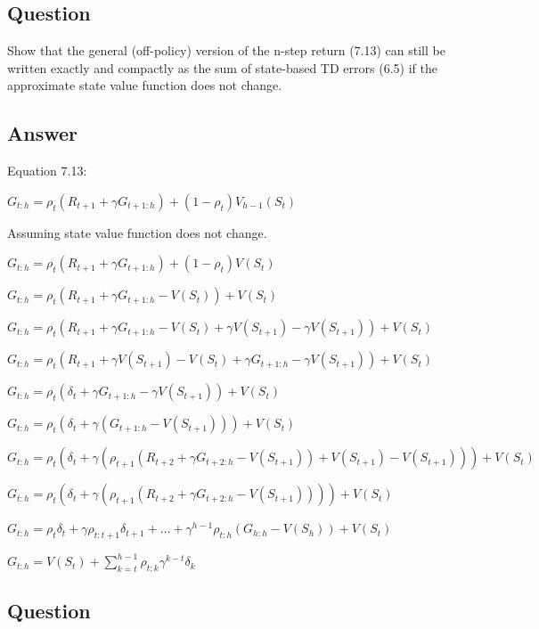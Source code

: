 \documentclass[11pt]{article}
\begin{document}
    \subsection{Question}

    Show that the general (off-policy) version of the n-step return (7.13) can still be written exactly and compactly as the sum of state-based TD errors (6.5) if the  approximate state value function does not change.

    \subsection*{Answer}

    Equation 7.13:

    $ G_{t:h} =  \rho_t (R_{t+1} + \gamma G_{t+1:h} ) + (1 - \rho_t) V_{h-1}(S_t) $

    \noindent Assuming state value function does not change.

    \noindent $ G_{t:h} = \rho_t (R_{t+1} + \gamma G_{t+1:h} ) + (1 - \rho_t) V(S_t) $

    \noindent $ G_{t:h} = \rho_t (R_{t+1} + \gamma G_{t+1:h} - V(S_t)) + V(S_t)  $

    \noindent $ G_{t:h} = \rho_t (R_{t+1} + \gamma G_{t+1:h} - V(S_t) + \gamma V(S_{t+1}) - \gamma V(S_{t+1})) + V(S_t)  $

    \noindent $ G_{t:h} = \rho_t (R_{t+1} + \gamma V(S_{t+1})- V(S_t)  + \gamma G_{t+1:h} - \gamma V(S_{t+1})) + V(S_t)  $

    \noindent $ G_{t:h} = \rho_t (\delta_t  + \gamma G_{t+1:h} - \gamma V(S_{t+1})) + V(S_t)  $

    \noindent $ G_{t:h} = \rho_t (\delta_t  + \gamma (G_{t+1:h} - V(S_{t+1}) )) + V(S_t)  $

    \noindent $ G_{t:h} = \rho_t (\delta_t  + \gamma (   \rho_{t+1} (R_{t+2} + \gamma G_{t+2:h} - V(S_{t+1})) + V(S_{t+1})  - V(S_{t+1}) )) + V(S_t)  $

    \noindent $ G_{t:h} = \rho_t (\delta_t  + \gamma (   \rho_{t+1} (R_{t+2} + \gamma G_{t+2:h} - V(S_{t+1})) )) + V(S_t)  $

    \noindent $ G_{t:h} = \rho_t \delta_t  + \gamma \rho_{t:t+1} \delta_{t+1} + \dots + \gamma^{h-1} \rho_{t:h} (G_{h:h} - V(S_h)) + V(S_t)  $

    \noindent $ G_{t:h} = V(S_t) + \sum_{k=t}^{h-1}  \rho_{t:k} \gamma^{k-t} \delta_k  $

    \subsection{Question}
\end{document}
